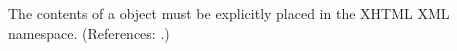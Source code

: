 The contents of a \Notes object must be explicitly placed in the
XHTML XML namespace.  (References: .)
